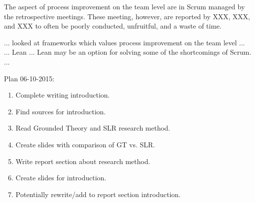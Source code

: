 The aspect of process improvement on the team level are in Scrum managed by the retrospective meetings. These meeting, however, are reported by XXX, XXX, and XXX to often be poorly conducted, unfruitful, and a waste of time. 

... looked at frameworks which values process improvement on the team level ...
... Lean ... Lean may be an option for solving some of the shortcomings of Scrum. ...



Plan 06-10-2015:
\begin{enumerate}
	\item Complete writing introduction.
	\item Find sources for introduction.
	\item Read Grounded Theory and SLR research method.
	\item Create slides with comparison of GT vs. SLR.
	\item Write report section about research method.
	\item Create slides for introduction.
	\item Potentially rewrite/add to report section introduction.
\end{enumerate}
